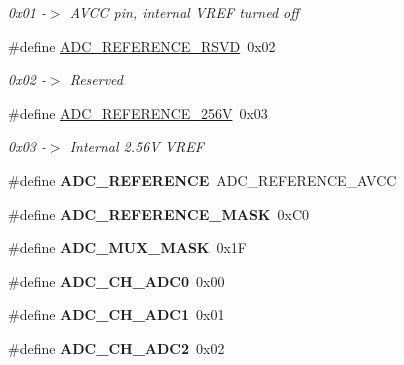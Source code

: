 \begin{CompactItemize}
\begin{CompactList}\small\item\em 0x01 -$>$ AVCC pin, internal VREF turned off \item\end{CompactList}\item 
\hypertarget{group__a2d_gac3a75f24755af19f114e475a4d6a074}{
\#define \hyperlink{group__a2d_gac3a75f24755af19f114e475a4d6a074}{ADC\_\-REFERENCE\_\-RSVD}~0x02}
\label{group__a2d_gac3a75f24755af19f114e475a4d6a074}

\begin{CompactList}\small\item\em 0x02 -$>$ Reserved \item\end{CompactList}\item 
\hypertarget{group__a2d_g51f3cc56fa25dc1a0ccf5b35a6b242bf}{
\#define \hyperlink{group__a2d_g51f3cc56fa25dc1a0ccf5b35a6b242bf}{ADC\_\-REFERENCE\_\-256V}~0x03}
\label{group__a2d_g51f3cc56fa25dc1a0ccf5b35a6b242bf}

\begin{CompactList}\small\item\em 0x03 -$>$ Internal 2.56V VREF \item\end{CompactList}\item 
\hypertarget{group__a2d_g317868c528ebe27fbca094a8bc2d910c}{
\#define \textbf{ADC\_\-REFERENCE}~ADC\_\-REFERENCE\_\-AVCC}
\label{group__a2d_g317868c528ebe27fbca094a8bc2d910c}

\item 
\hypertarget{group__a2d_g53d0721356cf990529435064b39810ac}{
\#define \textbf{ADC\_\-REFERENCE\_\-MASK}~0xC0}
\label{group__a2d_g53d0721356cf990529435064b39810ac}

\item 
\hypertarget{group__a2d_g7dc684a9d3f21b2a52dc74aea546d724}{
\#define \textbf{ADC\_\-MUX\_\-MASK}~0x1F}
\label{group__a2d_g7dc684a9d3f21b2a52dc74aea546d724}

\item 
\hypertarget{group__a2d_g2d71a76ac15bb23ced9d330f6d288189}{
\#define \textbf{ADC\_\-CH\_\-ADC0}~0x00}
\label{group__a2d_g2d71a76ac15bb23ced9d330f6d288189}

\item 
\hypertarget{group__a2d_gdc9061197abf445aa2fdabfe6ab70d6f}{
\#define \textbf{ADC\_\-CH\_\-ADC1}~0x01}
\label{group__a2d_gdc9061197abf445aa2fdabfe6ab70d6f}

\item 
\hypertarget{group__a2d_g2983118526a60d8131ea24b076734dc9}{
\#define \textbf{ADC\_\-CH\_\-ADC2}~0x02}
\label{group__a2d_g2983118526a60d8131ea24b076734dc9}


\end{CompactItemize}
